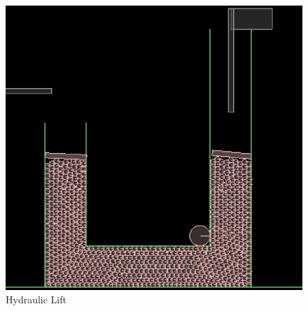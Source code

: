 \documentclass[a4paper,11pt]{article}
\begin{document}
{\begin{figure}[h]
    \centering
    \label{fig:image9}
    \includegraphics[scale=0.3]{image9}
    \caption{Hydraulic Lift}
\end{figure}

}

\newpage
\end{document}

